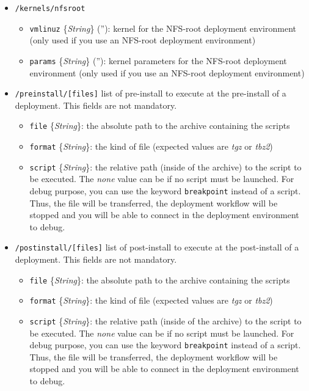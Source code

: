 \documentclass[a4wide,10pt,oneside]{book}
\newcommand{\ypath}[1]{\texttt{#1}}
\newcommand{\yfield}[2]{\texttt{#1} {\small\{{\emph{#2}}\}}:}
\newcommand{\yfieldd}[3]{\texttt{#1} {\small\{{\emph{#2}}\}} {\small(}#3{\small)}:}
\begin{document}
\begin{itemize}
  \item \ypath{/kernels/nfsroot}
  \begin{itemize}
    \item \yfieldd{vmlinuz}{String}{''} kernel for the NFS-root deployment environment (only used if you use an NFS-root deployment environment)
    \item \yfieldd{params}{String}{''} kernel parameters for the NFS-root deployment environment (only used if you use an NFS-root deployment environment)
  \end{itemize}

  \item \ypath{/preinstall/[files]} list of pre-install to execute at the pre-install of a deployment. This fields are not mandatory. 
  \begin{itemize}
    \item \yfield{file}{String} the absolute path to the archive containing the scripts
    \item \yfield{format}{String} the kind of file (expected values are \emph{tgz} or \emph{tbz2})
    \item \yfield{script}{String} the relative path (inside of the archive) to the script to be executed. The \textit{none} value can be if no script must be launched. For debug purpose, you can use the keyword \texttt{breakpoint} instead of a script. Thus, the file will be transferred, the deployment workflow will be stopped and you will be able to connect in the deployment environment to debug. 
  \end{itemize}

  \item \ypath{/postinstall/[files]} list of post-install to execute at the post-install of a deployment. This fields are not mandatory. 
  \begin{itemize}
    \item \yfield{file}{String} the absolute path to the archive containing the scripts
    \item \yfield{format}{String} the kind of file (expected values are \emph{tgz} or \emph{tbz2})
    \item \yfield{script}{String} the relative path (inside of the archive) to the script to be executed. The \textit{none} value can be if no script must be launched. For debug purpose, you can use the keyword \texttt{breakpoint} instead of a script. Thus, the file will be transferred, the deployment workflow will be stopped and you will be able to connect in the deployment environment to debug. 
  \end{itemize}


\end{itemize}
\end{document}
